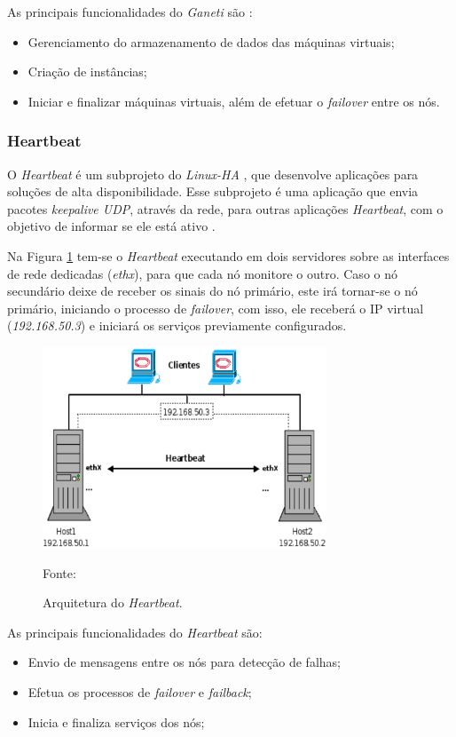 As principais funcionalidades do \textit{Ganeti} são \cite{ganeti}:
\begin{itemize}
 \item Gerenciamento do armazenamento de dados das máquinas virtuais;
 \item Criação de instâncias;
 \item Iniciar e finalizar máquinas virtuais, além de efetuar o \textit{failover} entre os nós.
\end{itemize}


\subsubsection{Heartbeat}
\label{section:heartbeat}
O \textit{Heartbeat} é um subprojeto do \textit{Linux-HA} \cite{linuxha}, que desenvolve aplicações para soluções de alta disponibilidade.
Esse subprojeto é uma aplicação que envia pacotes \textit{keepalive \ac{UDP}}, através da rede, para outras aplicações \textit{Heartbeat}, 
com o objetivo de informar se ele está ativo \cite{reis2009}.

Na Figura \ref{fig:heartbeat} tem-se o \textit{Heartbeat} executando em dois servidores sobre as interfaces de rede dedicadas (\textit{ethx}), 
para que cada nó monitore o outro. Caso o nó secundário deixe de receber os sinais do nó primário, este irá tornar-se o nó primário, iniciando o
processo de \textit{failover}, com isso, ele receberá o \ac{IP} virtual (\textit{192.168.50.3}) e iniciará os serviços previamente configurados.
\begin{figure}[h!]
 \centering
 \includegraphics[width=320px]{img/heartbeat.eps}
 \caption{Arquitetura do \textit{Heartbeat}.}
 Fonte: \citet{zaminhani2008}
 \label{fig:heartbeat}
\end{figure}

As principais funcionalidades do \textit{Heartbeat} são:
\begin{itemize}
 \item Envio de mensagens entre os nós para detecção de falhas;
 \item Efetua os processos de \textit{failover} e \textit{failback};
 \item Inicia e finaliza serviços dos nós;
\end{itemize}


